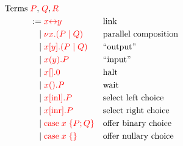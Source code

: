 \[\!
  \begin{aligned}
    \text{Terms} \; \textcolor{red}{P}, \; &\textcolor{red}{Q}, \textcolor{red}{R}
    \\   :=& \; \textcolor{red}{x{\leftrightarrow}y}       &&\text{link}
    \\ \mid& \; \textcolor{red}{\nu x.(P \mid Q)}     &&\text{parallel composition}
    \\ \mid& \; \textcolor{red}{x[y].(P \mid Q)} &&\text{``output''}
    \\ \mid& \; \textcolor{red}{x(y).P}    &&\text{``input''}
    \\ \mid& \; \textcolor{red}{x[].0}          &&\text{halt}
    \\ \mid& \; \textcolor{red}{x().P}       &&\text{wait}
    \\ \mid& \; \textcolor{red}{x[\text{inl}].P}        &&\text{select left choice}
    \\ \mid& \; \textcolor{red}{x[\text{inr}].P}        &&\text{select right choice}
    \\ \mid& \; \textcolor{red}{\text{case}\;x\;\{P;Q\}}    &&\text{offer binary choice}
    \\ \mid& \; \textcolor{red}{\text{case}\;x\;\{\}}        &&\text{offer nullary choice}
  \end{aligned}
\]
